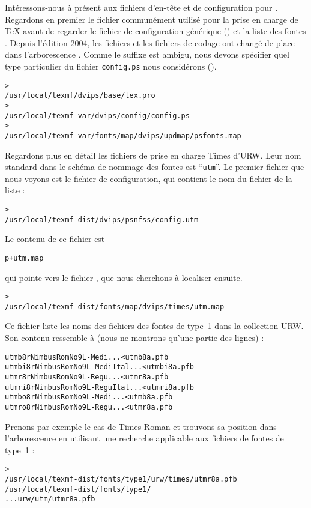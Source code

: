 \documentclass[german, english, french, 12pt]{article}
\renewcommand{\samp}[1]{\enquote{\texttt{#1}}}
\begin{document}
Intéressons-nous à présent aux fichiers d'en-tête et de configuration pour
.  Regardons en premier le fichier  communément
utilisé pour la prise en charge de \TeX{} avant de regarder le fichier de
configuration générique () et la liste des fontes \PS{}
.  Depuis l'édition 2004, les fichiers  et les
fichiers de codage ont changé de place dans l'arborescence
. Comme le suffixe  est ambigu, nous devons spécifier
quel type particulier du fichier \texttt{config.ps} nous considérons
().
\begin{alltt}
> 
   /usr/local/texmf/dvips/base/tex.pro
> 
   /usr/local/texmf-var/dvips/config/config.ps
> 
   /usr/local/texmf-var/fonts/map/dvips/updmap/psfonts.map
\end{alltt}

Regardons plus en détail les fichiers de prise en charge Times \PS{} d'URW. Leur
nom standard dans le schéma de nommage des fontes est \samp{utm}. Le premier
fichier que nous voyons est le fichier de configuration, qui contient le nom du
fichier de la liste :
\begin{alltt}
> 
   /usr/local/texmf-dist/dvips/psnfss/config.utm
\end{alltt}
Le contenu de ce fichier est
\begin{alltt}
  p +utm.map
\end{alltt}
qui pointe vers le fichier , que nous cherchons à localiser
ensuite.
\begin{alltt}
> 
  /usr/local/texmf-dist/fonts/map/dvips/times/utm.map
\end{alltt}
Ce fichier liste les noms des fichiers des fontes \PS{} de type~1 dans la
collection URW. Son contenu ressemble à (nous ne montrons qu'une partie des
lignes) :
\begin{alltt}
utmb8r  NimbusRomNo9L-Medi    ... <utmb8a.pfb
utmbi8r NimbusRomNo9L-MediItal... <utmbi8a.pfb
utmr8r  NimbusRomNo9L-Regu    ... <utmr8a.pfb
utmri8r NimbusRomNo9L-ReguItal... <utmri8a.pfb
utmbo8r NimbusRomNo9L-Medi    ... <utmb8a.pfb
utmro8r NimbusRomNo9L-Regu    ... <utmr8a.pfb
\end{alltt}
Prenons par exemple le cas de Times Roman  et trouvons sa
position dans l'arborescence  en utilisant une recherche applicable
aux fichiers de fontes de type~1 :
\begin{alltt}
> 
\ifSingleColumn   /usr/local/texmf-dist/fonts/type1/urw/times/utmr8a.pfb
\else   /usr/local/texmf-dist/fonts/type1/
... urw/utm/utmr8a.pfb
\fi\end{alltt}
\end{document}
